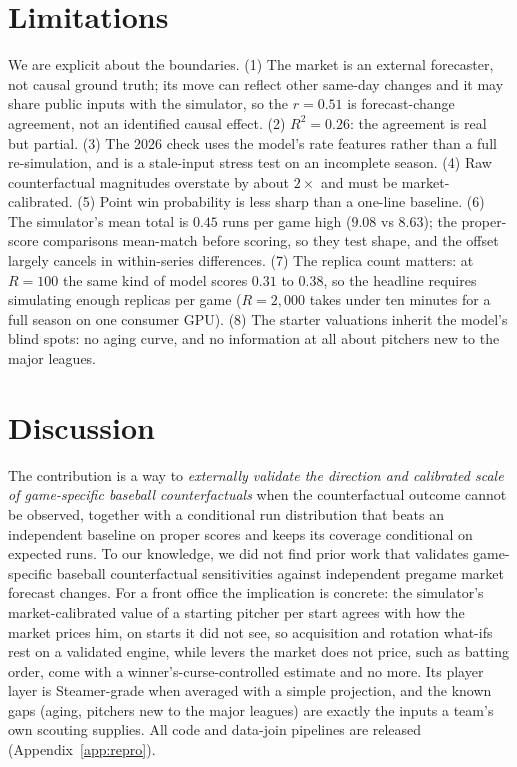\documentclass[10pt,twocolumn]{article}
\begin{document}
\section{Limitations}
We are explicit about the boundaries. (1) The market is an external forecaster, not causal ground truth;
its move can reflect other same-day changes and it may share public inputs with the simulator, so the
$r{=}0.51$ is forecast-change agreement, not an identified causal effect. (2) $R^2{=}0.26$: the
agreement is real but partial. (3) The 2026 check uses the model's rate features rather than a full
re-simulation, and is a stale-input stress test on an incomplete season. (4) Raw counterfactual magnitudes overstate by about $2\times$ and must be market-calibrated.
(5) Point win probability is less sharp than a one-line baseline. (6) The simulator's mean total is
$0.45$ runs per game high ($9.08$ vs $8.63$); the proper-score comparisons mean-match before scoring,
so they test shape, and the offset largely cancels in within-series differences. (7) The replica count
matters: at $R{=}100$ the same kind of model scores $0.31$ to $0.38$, so the headline requires
simulating enough replicas per game ($R{=}2{,}000$ takes under ten minutes for a full season on one consumer GPU). (8) The starter valuations inherit the model's blind spots: no
aging curve, and no information at all about pitchers new to the major leagues.

\section{Discussion}
The contribution is a way to \emph{externally validate the direction and calibrated scale of
game-specific baseball counterfactuals} when the counterfactual outcome cannot be observed, together with
a conditional run distribution that beats an independent baseline on proper scores and keeps its
coverage conditional on expected runs. To our knowledge, we did not find prior work that validates game-specific
baseball counterfactual sensitivities against independent pregame market forecast changes. For a front
office the implication is concrete: the simulator's market-calibrated value of a starting pitcher per
start agrees with how the market prices him, on starts it did not see, so acquisition and rotation
what-ifs rest on a validated engine, while levers the market does not price, such as batting order,
come with a winner's-curse-controlled estimate and no more. Its player layer is Steamer-grade when
averaged with a simple projection, and the known gaps (aging, pitchers new to the major leagues) are
exactly the inputs a team's own scouting supplies. All code and data-join pipelines are released
(Appendix~\ref{app:repro}).
\end{document}
